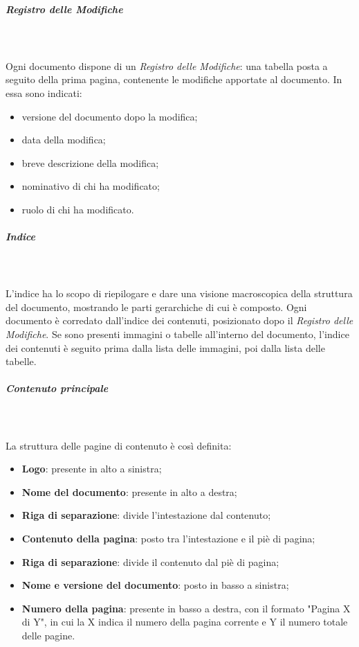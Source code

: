 \subparagraph{Registro delle Modifiche}\mbox{} \\ \mbox{} \\
Ogni documento dispone di un \textit{Registro delle Modifiche}: una tabella posta a seguito della prima pagina, contenente le modifiche apportate al documento. In essa sono indicati: \begin{itemize}
\item versione del documento dopo la modifica;
\item data della modifica;
\item breve descrizione della modifica;
\item nominativo di chi ha modificato;
\item ruolo di chi ha modificato.
\end{itemize}

\subparagraph{Indice}\mbox{} \\ \mbox{} \\
L'indice ha lo scopo di riepilogare e dare una visione macroscopica della struttura del documento, mostrando le parti gerarchiche di cui è composto. Ogni documento è corredato dall'indice dei contenuti, posizionato dopo il \textit{Registro delle Modifiche}. Se sono presenti immagini o tabelle all'interno del documento, l'indice dei contenuti è seguito prima dalla lista delle immagini, poi dalla lista delle tabelle.

\subparagraph{Contenuto principale}\mbox{} \\ \mbox{} \\
La struttura delle pagine di contenuto è così definita: \begin{itemize}
\item \textbf{Logo}: presente in alto a sinistra;
\item \textbf{Nome del documento}: presente in alto a destra;
\item \textbf{Riga di separazione}: divide l'intestazione dal contenuto;
\item \textbf{Contenuto della pagina}: posto tra l'intestazione e il piè di pagina;
\item \textbf{Riga di separazione}: divide il contenuto dal piè di pagina;
\item \textbf{Nome e versione del documento}: posto in basso a sinistra;
\item \textbf{Numero della pagina}: presente in basso a destra, con il formato "Pagina X di Y", in cui la X indica il numero della pagina corrente e Y il numero totale delle pagine.
\end{itemize}

